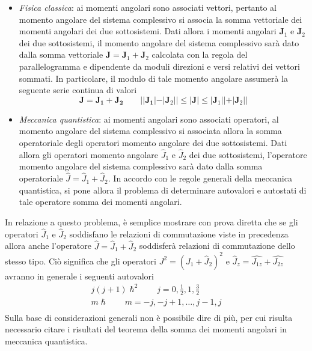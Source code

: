 \begin{itemize}
    \tightlist
    \item
    \emph{Fisica classica}: ai momenti angolari sono associati vettori,
    pertanto al momento angolare del sistema complessivo si associa la
    somma vettoriale dei momenti angolari dei due sottosistemi.
    Dati
    allora i momenti angolari \(\bm{J}_{1}\) e \(\bm{J}_{2}\) dei due
    sottosistemi, il momento angolare del sistema complessivo sarà dato
    dalla somma vettoriale \(\bm{J} = \bm{J}_{1}+ \bm{J}_{2}\) calcolata
    con la regola del parallelogramma e dipendente da moduli direzioni e
    versi relativi dei vettori sommati.
    In particolare, il modulo di tale
    momento angolare assumerà la seguente serie continua di valori \[
                                                                        \bm{J} = \bm{J_{1}} + \bm{J_{2}} \qquad | |\bm{J_{1}}| - |\bm{J}_{2}| | \leq | \bm{J}| \leq|\bm{J}_{1} | | + | \bm{J}_{2} | |
    \]
    \item
    \emph{Meccanica quantistica}: ai momenti angolari sono associati
    operatori, al momento angolare del sistema complessivo si associata
    allora la somma operatoriale degli operatori momento angolare dei due
    sottosistemi.
    Dati allora gli operatori momento angolare
    \(\hat{J}_{1}\) e \(\hat{J}_{2}\) dei due sottosistemi, l'operatore
    momento angolare del sistema complessivo sarà dato dalla somma
    operatoriale \(\hat{J} = \hat{J}_{1}+ \hat{J}_{2}\).
    In accordo con le
    regole generali della meccanica quantistica, si pone allora il
    problema di determinare autovalori e autostati di tale operatore somma
    dei momenti angolari.
\end{itemize}

In relazione a questo problema, è semplice mostrare con prova diretta
che se gli operatori \(\hat{J}_{1}\) e \(\hat{J}_{2}\) soddisfano le
relazioni di commutazione viste in precedenza allora anche l'operatore
\(\hat{J} = \hat{J}_{1}+ \hat{J}_{2}\) soddisferà relazioni di
commutazione dello stesso tipo.
Ciò significa che gli operatori
\(J^{2} = (J_{1} + \hat{J}_{2})^{2}\) e
\(\hat{J}_{z} = \hat{J_{1z}} + \hat{J_{2z}}\) avranno in generale i
seguenti autovalori \begin{gather*}
    j(j+1) \hslash^{2} \qquad j = 0, \frac{1}{2}, 1, \frac{3}{2}\\
    m \hslash  \qquad m = -j , -j +1, \dots , j-1, j\\
\end{gather*} Sulla base di considerazioni generali non è possibile dire di più,
per cui risulta necessario citare i risultati del teorema della somma
dei momenti angolari in meccanica quantistica.

